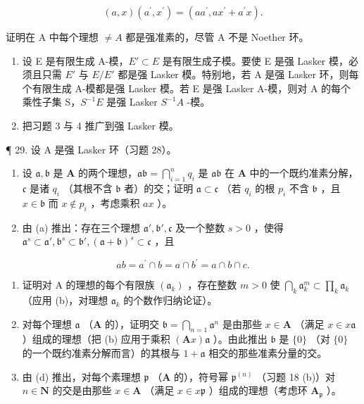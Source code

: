 \[
(a, x) (a ^ {\prime}, x ^ {\prime}) = (a a ^ {\prime}, a x ^ {\prime} + a ^ {\prime} x).
\]

证明在 A 中每个理想 \(\neq A\) 都是强准素的，尽管 A 不是 Noether 环。

\begin{enumerate}
\def\labelenumi{(\alph{enumi})}
\setcounter{enumi}{3}
\item
  设 E 是有限生成 A-模，\(E' \subset E\) 是有限生成子模。要使 E 是强 Lasker 模，必须且只需 \(E'\) 与 \(E/E'\) 都是强 Lasker 模。特别地，若 A 是强 Lasker 环，则每个有限生成 A-模都是强 Lasker 模。若 E 是强 Lasker A-模，则对 A 的每个乘性子集 S，\(S^{-1}E\) 是强 Lasker \(S^{-1}A\) -模。
\item
  把习题 3 与 4 推广到强 Lasker 模。
\end{enumerate}

¶ 29. 设 A 是强 Lasker 环（习题 28）。

\begin{enumerate}
\def\labelenumi{(\alph{enumi})}
\item
  设 \(\mathfrak{a}, \mathfrak{b}\) 是 \(\mathbf{A}\) 的两个理想，\(\mathfrak{ab} = \bigcap_{i=1}^{n} q_i\) 是 \(\mathfrak{ab}\) 在 \(\mathbf{A}\) 中的一个既约准素分解，\(\mathfrak{c}\) 是诸 \(q_i\) （其根不含 \(\mathfrak{b}\) 者）的交；证明 \(\mathfrak{a} \subset \mathfrak{c}\) （若 \(q_i\) 的根 \(p_i\) 不含 \(\mathfrak{b}\) ，且 \(x \in \mathfrak{b}\) 而 \(x \notin p_i\) ，考虑乘积 \(ax\) ）。
\item
  由 (a) 推出：存在三个理想 \(\mathfrak{a}', \mathfrak{b}', \mathfrak{c}\) 及一个整数 \(s > 0\) ，使得 \(\mathfrak{a}^s \subset \mathfrak{a}', \mathfrak{b}^s \subset \mathfrak{b}', (\mathfrak{a} + \mathfrak{b})^s \subset \mathfrak{c}\) ，且
\end{enumerate}

\[
a b = a ^ {\prime} \cap b = a \cap b ^ {\prime} = a \cap b \cap c.
\]

\begin{enumerate}
\def\labelenumi{(\alph{enumi})}
\setcounter{enumi}{2}
\item
  证明对 A 的理想的每个有限族 \((\mathfrak{a}_k)\) ，存在整数 \(m > 0\) 使 \(\bigcap_{k} \mathfrak{a}_k^m \subset \prod_{k} \mathfrak{a}_k\) （应用 (b)，对理想 \(\mathfrak{a}_k\) 的个数作归纳论证）。
\item
  对每个理想 \(\mathfrak{a}\) （\(\mathbf{A}\) 的），证明交 \(\mathfrak{b} = \bigcap_{n=1} \mathfrak{a}^n\) 是由那些 \(x \in \mathbf{A}\) （满足 \(x \in x\mathfrak{a}\) ）组成的理想（把 (b) 应用于乘积 \((\mathbf{A}x)\mathfrak{a}\) ）。由此推出 \(\mathfrak{b}\) 是 \(\{0\}\) （对 \(\{0\}\) 的一个既约准素分解而言）的其根与 \(1 + \mathfrak{a}\) 相交的那些准素分量的交。
\item
  由 (d) 推出，对每个素理想 \(\mathfrak{p}\) （\(\mathbf{A}\) 的），符号幂 \(\mathfrak{p}^{(n)}\) （习题 18 (b)）对 \(n\in\mathbf{N}\) 的交是由那些 \(x\in\mathbf{A}\) （满足 \(x\in x\mathfrak{p}\) ）组成的理想（考虑环 \(\mathbf{A}_{\mathfrak{p}}\) ）。
\end{enumerate}

